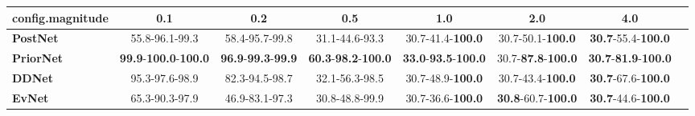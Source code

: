 \begin{tabular}{lccccccc}
\toprule
\textbf{config.magnitude} &                                          0.1 &                                        0.2 &                                         0.5 &                                         1.0 &                                2.0 &                                         4.0 \\
\midrule
\textbf{PostNet } &                               55.8-96.1-99.3 &                             58.4-95.7-99.8 &                              31.1-44.6-93.3 &                    30.7-41.4-\textbf{100.0} &           30.7-50.1-\textbf{100.0} &           \textbf{30.7}-55.4-\textbf{100.0} \\
\textbf{PriorNet} &  \textbf{99.9}-\textbf{100.0}-\textbf{100.0} &  \textbf{96.9}-\textbf{99.3}-\textbf{99.9} &  \textbf{60.3}-\textbf{98.2}-\textbf{100.0} &  \textbf{33.0}-\textbf{93.5}-\textbf{100.0} &  30.7-\textbf{87.8}-\textbf{100.0} &  \textbf{30.7}-\textbf{81.9}-\textbf{100.0} \\
\textbf{DDNet   } &                               95.3-97.6-98.9 &                             82.3-94.5-98.7 &                              32.1-56.3-98.5 &                    30.7-48.9-\textbf{100.0} &           30.7-43.4-\textbf{100.0} &           \textbf{30.7}-67.6-\textbf{100.0} \\
\textbf{EvNet   } &                               65.3-90.3-97.9 &                             46.9-83.1-97.3 &                              30.8-48.8-99.9 &                    30.7-36.6-\textbf{100.0} &  \textbf{30.8}-60.7-\textbf{100.0} &           \textbf{30.7}-44.6-\textbf{100.0} \\
\bottomrule
\end{tabular}
